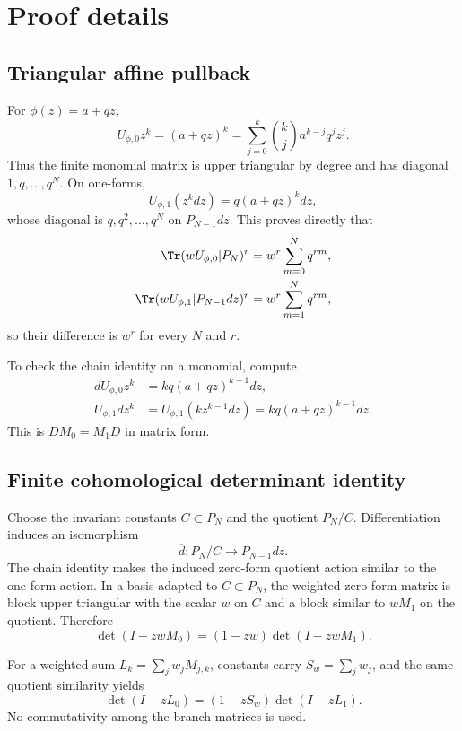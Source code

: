\section{Proof details}
\label{app:proofs}

\subsection{Triangular affine pullback}

For \(\phi(z)=a+qz\),
\[
 U_{\phi,0}z^k=(a+qz)^k
 =\sum_{j=0}^k\binom{k}{j}a^{k-j}q^jz^j.
\]
Thus the finite monomial matrix is upper triangular by degree and has
diagonal \(1,q,\ldots,q^N\).  On one-forms,
\[
 U_{\phi,1}(z^kdz)=q(a+qz)^kdz,
\]
whose diagonal is \(q,q^2,\ldots,q^N\) on
\(P_{N-1}dz\).  This proves directly that
\begin{align*}
 \Tr(wU_{\phi,0}|P_N)^r
 &=w^r\sum_{m=0}^Nq^{rm},\\
 \Tr(wU_{\phi,1}|P_{N-1}dz)^r
 &=w^r\sum_{m=1}^Nq^{rm},
\end{align*}
so their difference is \(w^r\) for every \(N\) and \(r\).

To check the chain identity on a monomial, compute
\begin{align*}
 dU_{\phi,0}z^k
 &=kq(a+qz)^{k-1}dz,\\
 U_{\phi,1}d z^k
 &=U_{\phi,1}(kz^{k-1}dz)
 =kq(a+qz)^{k-1}dz.
\end{align*}
This is \(DM_0=M_1D\) in matrix form.

\subsection{Finite cohomological determinant identity}

Choose the invariant constants \(C\subset P_N\) and the quotient
\(P_N/C\).  Differentiation induces an isomorphism
\[
        \overline d:P_N/C\longrightarrow P_{N-1}dz.
\]
The chain identity makes the induced zero-form quotient action similar to
the one-form action.  In a basis adapted to \(C\subset P_N\), the weighted
zero-form matrix is block upper triangular with the scalar \(w\) on \(C\)
and a block similar to \(wM_1\) on the quotient.  Therefore
\[
 \det(I-zwM_0)=(1-zw)\det(I-zwM_1).
\]

For a weighted sum \(L_k=\sum_jw_jM_{j,k}\), constants carry
\(S_w=\sum_jw_j\), and the same quotient similarity yields
\[
 \det(I-zL_0)=(1-zS_w)\det(I-zL_1).
\]
No commutativity among the branch matrices is used.

